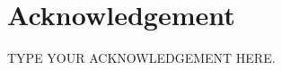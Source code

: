 \clearpage
{}
{}
\section*{\centering Acknowledgement}
\vspace{0.5cm}

TYPE YOUR ACKNOWLEDGEMENT HERE.
\clearpage
